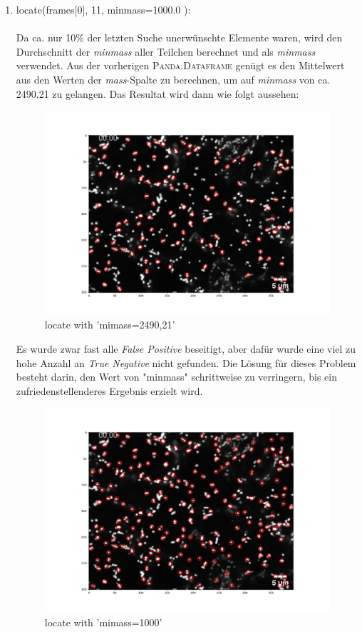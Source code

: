 \begin{enumerate}
    			
    			\item locate(frames[0], 11, minmass=1000.0 ): \\ \\
    			Da ca. nur 10\% der letzten Suche unerwünschte Elemente waren, wird den Durchschnitt der \textit{minmass} aller Teilchen berechnet und als \textit{minmass} verwendet. Aus der vorherigen \textsc{Panda.Dataframe} genügt es den Mittelwert aus den Werten der \textit{mass}-Spalte zu berechnen, um auf \textit{minmass} von ca. 2490.21 zu gelangen. Das Resultat wird dann wie folgt aussehen:
\begin{figure}[H]
    \centering
    \includegraphics[scale=0.35]{Grafiken/trackpyBilder/locate_with_minmass_01.png}
    \caption{locate with 'mimass=2490,21'}
\end{figure}
Es wurde zwar fast alle \textit{False Positive} beseitigt, aber dafür wurde eine viel zu hohe Anzahl an \textit{True Negative} nicht gefunden. Die Lösung für dieses Problem besteht darin, den Wert von "minmass" schrittweise zu verringern, bis ein zufriedenstellenderes Ergebnis erzielt wird.
\begin{figure}[H]
    \centering
    \includegraphics[scale=0.35]{Grafiken/trackpyBilder/locate_with_minmass_02.png}
    \caption{locate with 'mimass=1000'}
\end{figure}


\end{enumerate}
